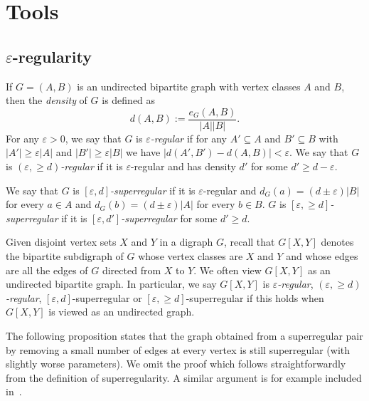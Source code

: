 \documentclass{memo-l}
\def\COMMENT#1{}
\def\eps{\varepsilon}
\numberwithin{section}{chapter}
\numberwithin{equation}{section}
\numberwithin{firstthm}{section}
\numberwithin{figure}{section}
\begin{document}

\section{Tools} \label{sec:tools}
\subsection{$\eps$-regularity} 
If $G=(A,B)$ is an undirected bipartite graph with vertex classes $A$ and $B$, then the
\emph{density} of $G$ is defined as
$$ d(A, B) := \frac{e_G(A,B)}{|A||B|}.$$
For any $\eps >0$, we say that $G$ is \emph{$\eps$-regular} if for any $A'\subseteq A$
and $B' \subseteq B$ with $|A'| \geq \eps |A|$ and $|B'| \geq \eps |B|$
we have $|d(A',B') - d(A, B)| < \eps$. We say that $G$ is \emph{$(\eps, \ge d)$-regular} if
it is $\eps$-regular and has density $d'$ for some $d' \ge d-\eps$.

We say that $G$ is \emph{$[\eps,d]$-superregular} if it is $\eps$-regular and $d_G(a)=(d\pm \eps)|B|$
for every $a\in A$ and $d_G(b)=(d\pm \eps)|A|$ for every $b\in B$. $G$ is \emph{$[\eps, \ge d]$-superregular} if
it is  \emph{$[\eps, d']$-superregular} for some $d' \ge d$.

Given disjoint vertex sets $X$ and $Y$ in a digraph $G$, recall that $G[X,Y]$ denotes
the bipartite subdigraph of $G$ whose vertex classes are $X$ and $Y$ and whose
edges are all the edges of $G$ directed from $X$ to $Y$. We often view $G[X,Y]$ as
an undirected bipartite graph. In particular, we say $G[X,Y]$ is \emph{$\eps$-regular},
\emph{$(\eps,\ge d)$-regular}, $[\eps,d]$-superregular or $[\eps, \ge d]$-superregular
if this holds when $G[X,Y]$ is viewed as an undirected graph.

The following proposition states that the graph obtained from a superregular pair
by removing a small number of edges at every vertex is still
superregular (with slightly worse parameters). We omit the proof which follows straightforwardly from the definition of superregularity.
A similar argument is for example included in~\cite{Kelly}.%
   \COMMENT{In the Kelly paper we have $0 <1/m \ll \eps \le d' \le d \ll 1$ and the proof doesn't work for
$0 <1/m \ll \eps \le d' \le d \le 1/2$ say (we want to keep $d' \le d$ there). So here is the proof for
the hierarchy in the prop. Let us first prove check that $G'$ is $2\sqrt{d'}$-regular. Let $d^*$ denote the density of $G$.
Suppose that $S\subseteq A$, $T\subseteq B$ are such that $|S|\ge \sqrt{d'}m$
and $|T|\ge \sqrt{d'}m$. 
Then $e_{G'}(S,T) \ge (d^*-\eps)|S||T| - |S|d'm   \ge (d^*-\eps)|S||T|-|S|d'\cdot |T|/\sqrt{d'}\ge (d^*-2\sqrt{d'})|S||T|$.
Since clearly $e_{G'}(S,T)\le e_{G}(S,T)\le (d^*+\eps)|S||T|$, $G$ is $2\sqrt{d'}$-regular.
Note that in $G'$ the degrees of the vertices in $A'$ are still at most
$(d+\eps)m\le (d+\eps)|B'|/(1-d')\le (d+2\sqrt{d'})|B'|$. Similarly, the degrees in $G'$ of the vertices in
$B'$ are still at most $(d+2\sqrt{d'})|A'|$.}
\end{document}
